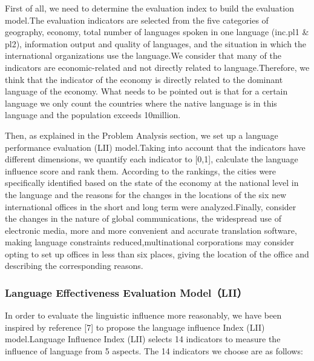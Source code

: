 \par First of all, we need to determine the evaluation index to build the evaluation model.The evaluation indicators are selected from the five categories of geography, economy, total number of languages spoken in one language (inc.pl1 \& pl2), information output and quality of languages, and the situation in which the international organizations use the language.We consider that many of the indicators are economic-related and not directly related to language.Therefore, we think that the indicator of the economy is directly related to the dominant language of the economy. What needs to be pointed out is that for a certain language we only count the countries where the native language is in this language and the population exceeds 10million.
\par Then, as explained in the Problem Analysis section, we set up a language performance evaluation (LII) model.Taking into account that the indicators have different dimensions, we quantify each indicator to [0,1], calculate the language influence score and rank them. According to the rankings, the cities were specifically identified based on the state of the economy at the national level in the language and the reasons for the changes in the locations of the six new international offices in the short and long term were analyzed.Finally, consider the changes in the nature of global communications, the widespread use of electronic media, more and more convenient and accurate translation software, making language constraints reduced,multinational corporations may consider opting to set up offices in less than six places, giving the location of the office and describing the corresponding reasons.

\subsubsection{Language Effectiveness Evaluation Model（LII）} 

\noindent In order to evaluate the linguistic influence more reasonably, we have been inspired by reference [7] to propose the language influence Index (LII) model.Language Influence Index (LII) selects 14 indicators to measure the influence of language from 5 aspects. The 14 indicators we choose are as follows:


